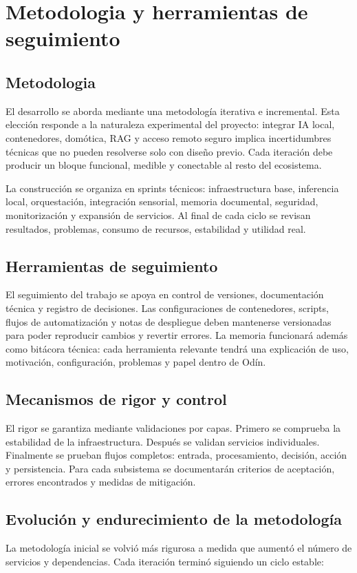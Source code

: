 \chapter{Metodologia y herramientas de seguimiento}

\section{Metodologia}
El desarrollo se aborda mediante una metodología iterativa e incremental. Esta elección responde a la naturaleza experimental del proyecto: integrar IA local, contenedores, domótica, RAG y acceso remoto seguro implica incertidumbres técnicas que no pueden resolverse solo con diseño previo. Cada iteración debe producir un bloque funcional, medible y conectable al resto del ecosistema.

La construcción se organiza en sprints técnicos: infraestructura base, inferencia local, orquestación, integración sensorial, memoria documental, seguridad, monitorización y expansión de servicios. Al final de cada ciclo se revisan resultados, problemas, consumo de recursos, estabilidad y utilidad real.

\section{Herramientas de seguimiento}
El seguimiento del trabajo se apoya en control de versiones, documentación técnica y registro de decisiones. Las configuraciones de contenedores, scripts, flujos de automatización y notas de despliegue deben mantenerse versionadas para poder reproducir cambios y revertir errores. La memoria funcionará además como bitácora técnica: cada herramienta relevante tendrá una explicación de uso, motivación, configuración, problemas y papel dentro de Odín.

\section{Mecanismos de rigor y control}
El rigor se garantiza mediante validaciones por capas. Primero se comprueba la estabilidad de la infraestructura. Después se validan servicios individuales. Finalmente se prueban flujos completos: entrada, procesamiento, decisión, acción y persistencia. Para cada subsistema se documentarán criterios de aceptación, errores encontrados y medidas de mitigación.

\section{Evolución y endurecimiento de la metodología}
La metodología inicial se volvió más rigurosa a medida que aumentó el número de servicios y dependencias. Cada iteración terminó siguiendo un ciclo estable:

